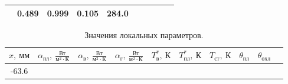 \documentclass[a4paper,12pt]{article}
\begin{document}
\begin{longtable}{
     |
%    
    c|
%    
    c|
%    
    c|
%    
    c|
%    
    c|
%    
    c|
%    
    c|
%    
    c|
%    
    c|
%    
    c|
%    
    }
%        
        & 0.489
%        

%        

%        
        & 0.999
%        

%        

%        
        & 0.105
%        

%        

%        
        & 284.0
%        

%        
        \\
        \hline

        
    \end{longtable}
%    
%    
    \begin{longtable}{
     |
%    
    c|
%    
    c|
%    
    c|
%    
    c|
%    
    c|
%    
    c|
%    
    c|
%    
    c|
%    
    c|
%    
    c|
%    
    }
        \caption{Значения локальных параметров.} \\
        \hline
%        

%        
        $x,\ мм$
%        

%        

%        
        & $\alpha_{пл},\ \frac{Вт}{м^2 \cdot К}$
%        

%        

%        
        & $\alpha_{в},\ \frac{Вт}{м^2 \cdot К}$
%        

%        

%        
        & $\alpha_{г},\ \frac{Вт}{м^2 \cdot К}$
%        

%        

%        
        & $T_{в}^*,\ К$
%        

%        

%        
        & $T_{пл}^*,\ К$
%        

%        

%        
        & $T_{ст},\ К$
%        

%        

%        
        & $\theta_{пл}$
%        

%        

%        
        & $\theta_{охл}$
%        

%        
        \\
        \hline

%        

%        

%        
        -63.6
%        

%        


\end{longtable}
\end{document}
